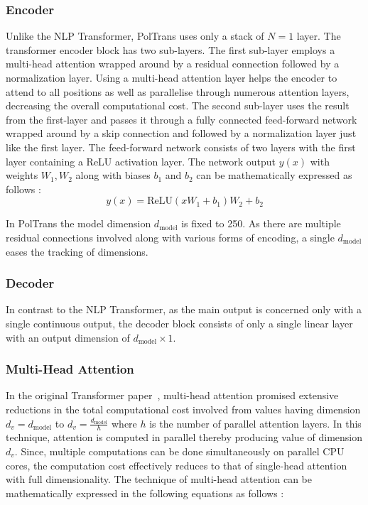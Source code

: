 \documentclass[twocolumn]{svjour3}          %
\begin{document}
\subsubsection{Encoder}
Unlike the NLP Transformer, {PolTrans} uses only a stack of ${N = 1}$ layer. The transformer encoder block has two sub-layers. The first sub-layer employs a multi-head attention wrapped around by a residual connection followed by a normalization layer. Using a multi-head attention layer helps the encoder to attend to all positions as well as parallelise through numerous attention layers, decreasing the overall computational cost. The second sub-layer uses the result from the first-layer and passes it through a fully connected feed-forward network wrapped around by a skip connection and followed by a normalization layer just like the first layer.
The feed-forward network consists of two layers with the first layer containing a ReLU activation layer. The network output ${y(x)}$ with weights ${W_1, W_2}$ along with biases ${b_1}$ and ${b_2}$ can be mathematically expressed as follows :
\begin{equation}
y (x) = \text{ReLU}(xW_1 + b_1)W_2 + b_2
\end{equation}

In {PolTrans} the model dimension ${d_{\text{model}}}$ is fixed to 250. As there are multiple residual connections involved along with various forms of encoding, a single ${d_{\text{model}}}$ eases the tracking of dimensions.

\subsubsection{Decoder}
In contrast to the NLP Transformer, as the main output is concerned only with a single continuous output, the decoder block consists of only a single linear layer with an output dimension of ${d_{\text{model}} \times 1}$.

\subsubsection{Multi-Head Attention}
In the original Transformer paper~\cite{Vaswani.2017}, multi-head attention promised extensive reductions in the total computational cost involved from values having dimension ${d_{v} = d_{\text{model}}}$ to ${d_{v} = \frac{d_{\text{model}}}{h}}$ where ${h}$ is the number of parallel attention layers. In this technique, attention is computed in parallel thereby producing value of dimension ${d_{v}}$. Since, multiple computations can be done simultaneously on parallel CPU cores, the computation cost effectively reduces to that of single-head attention with full dimensionality. The technique of multi-head attention can be mathematically expressed in the following equations as follows :
\end{document}
